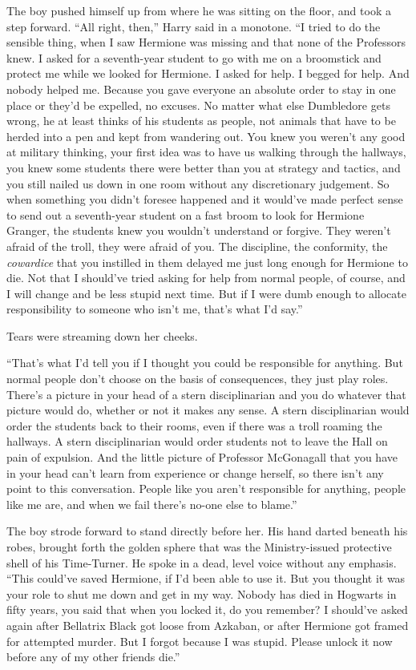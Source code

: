 The boy pushed himself up from where he was sitting on the floor, and took a step forward. “All right, then,” Harry said in a monotone. “I tried to do the sensible thing, when I saw Hermione was missing and that none of the Professors knew. I asked for a seventh-year student to go with me on a broomstick and protect me while we looked for Hermione. I asked for help. I begged for help. And nobody helped me. Because you gave everyone an absolute order to stay in one place or they’d be expelled, no excuses. No matter what else Dumbledore gets wrong, he at least thinks of his students as people, not animals that have to be herded into a pen and kept from wandering out. You knew you weren’t any good at military thinking, your first idea was to have us walking through the hallways, you knew some students there were better than you at strategy and tactics, and you still nailed us down in one room without any discretionary judgement. So when something you didn’t foresee happened and it would’ve made perfect sense to send out a seventh-year student on a fast broom to look for Hermione Granger, the students knew you wouldn’t understand or forgive. They weren’t afraid of the troll, they were afraid of you. The discipline, the conformity, the \emph{cowardice} that you instilled in them delayed me just long enough for Hermione to die. Not that I should’ve tried asking for help from normal people, of course, and I will change and be less stupid next time. But if I were dumb enough to allocate responsibility to someone who isn’t me, that’s what I’d say.”

Tears were streaming down her cheeks.

“That’s what I’d tell you if I thought you could be responsible for anything. But normal people don’t choose on the basis of consequences, they just play roles. There’s a picture in your head of a stern disciplinarian and you do whatever that picture would do, whether or not it makes any sense. A stern disciplinarian would order the students back to their rooms, even if there was a troll roaming the hallways. A stern disciplinarian would order students not to leave the Hall on pain of expulsion. And the little picture of Professor McGonagall that you have in your head can’t learn from experience or change herself, so there isn’t any point to this conversation. People like you aren’t responsible for anything, people like me are, and when we fail there’s no-one else to blame.”

The boy strode forward to stand directly before her. His hand darted beneath his robes, brought forth the golden sphere that was the Ministry-issued protective shell of his Time-Turner. He spoke in a dead, level voice without any emphasis. “This could’ve saved Hermione, if I’d been able to use it. But you thought it was your role to shut me down and get in my way. Nobody has died in Hogwarts in fifty years, you said that when you locked it, do you remember? I should’ve asked again after Bellatrix Black got loose from Azkaban, or after Hermione got framed for attempted murder. But I forgot because I was stupid. Please unlock it now before any of my other friends die.”


